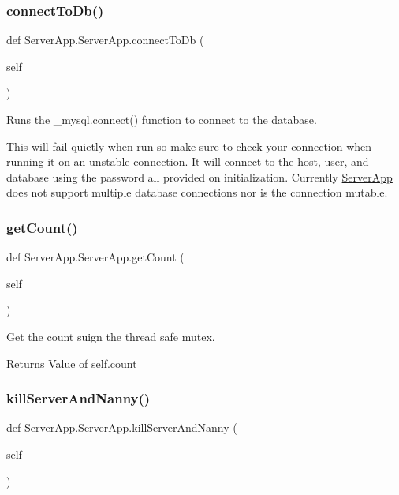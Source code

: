\subsubsection{\texorpdfstring{connect\+To\+Db()}{connectToDb()}}
{\footnotesize\ttfamily def Server\+App.\+Server\+App.\+connect\+To\+Db (\begin{DoxyParamCaption}\item[{}]{self }\end{DoxyParamCaption})}



Runs the \+\_\+mysql.\+connect() function to connect to the database. 

This will fail quietly when run so make sure to check your connection when running it on an unstable connection. It will connect to the host, user, and database using the password all provided on initialization. Currently \mbox{\hyperlink{class_server_app_1_1_server_app}{Server\+App}} does not support multiple database connections nor is the connection mutable. \mbox{\label{class_server_app_1_1_server_app_a5b6f47399a9434d1a3b86f89a114a44c}} 
\subsubsection{\texorpdfstring{get\+Count()}{getCount()}}
{\footnotesize\ttfamily def Server\+App.\+Server\+App.\+get\+Count (\begin{DoxyParamCaption}\item[{}]{self }\end{DoxyParamCaption})}



Get the count suign the thread safe mutex. 

\begin{DoxyReturn}{Returns}
Value of self.\+count 
\end{DoxyReturn}
\mbox{\label{class_server_app_1_1_server_app_acee9930736fb8b9ff4d1229cfede83e4}} 
\subsubsection{\texorpdfstring{kill\+Server\+And\+Nanny()}{killServerAndNanny()}}
{\footnotesize\ttfamily def Server\+App.\+Server\+App.\+kill\+Server\+And\+Nanny (\begin{DoxyParamCaption}\item[{}]{self }\end{DoxyParamCaption})}



